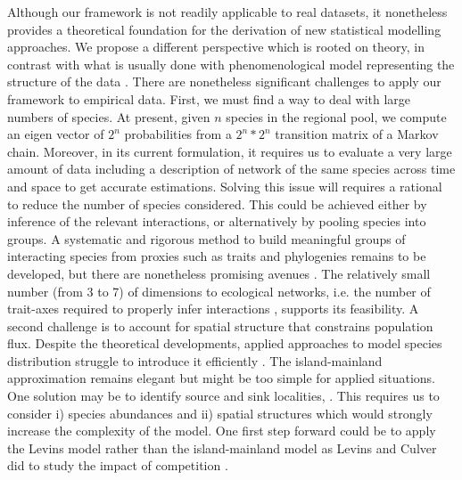 Although our framework is not readily applicable to real datasets, it nonetheless provides a theoretical foundation for the derivation of new statistical modelling approaches. We propose a different perspective which is rooted on theory, in contrast with what is usually done with phenomenological model representing the structure of the data \citep{Thuiller2013}. There are nonetheless significant challenges to apply our framework to empirical data. First, we must find a way to deal with large numbers of species. At present, given $n$ species in the regional pool, we compute an eigen vector of $2^n$ probabilities from a $2^n*2^n$ transition matrix of a Markov chain. Moreover, in its current formulation, it requires us to evaluate a very large amount of data including a description of network of the same species across time and space to get accurate estimations. Solving this issue will requires a rational to reduce the number of species considered. This could be achieved either by inference of the relevant interactions, or alternatively by pooling species into groups. A systematic and rigorous method to build meaningful groups of interacting species from proxies such as traits and phylogenies remains to be developed, but there are nonetheless promising avenues \citep{Baskerville2011}. The relatively small number (from 3 to 7) of dimensions to ecological networks, i.e. the number of trait-axes required to properly infer interactions \citep{Eklof2013}, supports its feasibility. A second challenge is to account for spatial structure that constrains population flux. Despite the theoretical developments, applied approaches to model species distribution struggle to introduce it efficiently \citep{Boulangeat2012}. The island-mainland approximation remains elegant but might be too simple for applied situations. One solution may be to identify source and sink localities, \citep{Boulangeat2012}. This requires us to consider i) species abundances and ii) spatial structures which would strongly increase the complexity of the model. One first step forward could be to apply the Levins model rather than the island-mainland model as Levins and Culver did to study the impact of competition \citep{Levins1971}.

